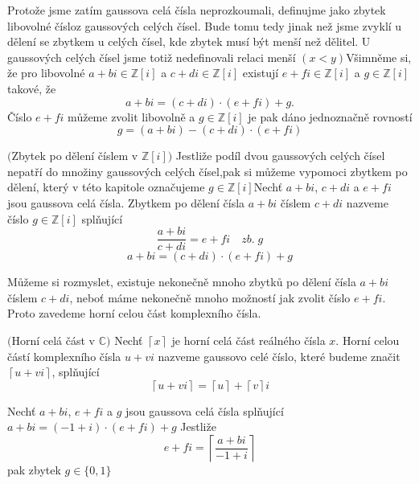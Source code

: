 \documentclass[czech,bachelor,dept470,male]{diploma}
\begin{document}
Protože jsme zatím gaussova celá čísla neprozkoumali, definujme jako zbytek libovolné číslo\newline z gaussových celých čísel. Bude tomu tedy jinak než jsme zvyklí u dělení se zbytkem u celých čísel, kde zbytek musí být menší než dělitel. U gaussových celých čísel jsme totiž nedefinovali relaci menší $(x<y)$\newline Všimněme si, že pro libovolné $a+bi \in \mathbb{Z}[i]$ a $c+di \in \mathbb{Z}[i]$ existují $e+fi \in \mathbb{Z}[i]$ a $g\in \mathbb{Z}[i]$ takové, že
$$a+bi = (c+di)\cdot(e+fi) + g. $$
Číslo $e+fi$ můžeme zvolit libovolně a $g\in \mathbb{Z}[i]$ je pak dáno jednoznačně rovností $$g = (a+bi) - (c+di)\cdot(e+fi)$$
\begin{definition}\label{KDZ}$($Zbytek po dělení číslem v $\mathbb{Z}[i])$\newline
	Jestliže podíl dvou gaussových celých čísel nepatří do množiny gaussových celých čísel,\newline pak si můžeme vypomoci zbytkem po dělení, který v této kapitole označujeme $g \in \mathbb{Z}[i]$\newline Nechť $a+bi$, $c+di$ a $e+fi$ jsou gaussova celá čísla. Zbytkem po dělení čísla $a+bi$ číslem $c+di$ nazveme číslo $g \in \mathbb{Z}[i]$ splňující
	$$\frac{a+bi}{c+di}=e+fi \quad zb.\;g$$$$a+bi = (c+di)\cdot(e+fi) + g$$
\end{definition}
Můžeme si rozmyslet, existuje nekonečně mnoho zbytků po dělení čísla $a+bi$ číslem $c+di$, neboť máme nekonečně mnoho možností jak zvolit číslo $e+fi$.
Proto zavedeme horní celou část komplexního čísla.
\begin{definition}
	$($Horní celá část v $\mathbb{C})$ Nechť $\left\lceil x \right\rceil$ je horní celá část reálného čísla $x$. Horní celou částí komplexního čísla $u+vi$ nazveme gaussovo celé číslo, které budeme značit $\left\lceil u+vi \right\rceil$, splňující
	$$\left\lceil u+vi \right\rceil = \left\lceil u \right\rceil + \left\lceil v \right\rceil i $$
\end{definition}
\begin{theorem}\label{VX}
	Nechť $a+bi$, $e+fi$ a $g$ jsou gaussova celá čísla splňující
	$a+bi = (-1+i)\cdot(e+fi) + g$ Jestliže
	$$ e+fi = \left\lceil\frac{a+bi}{-1+i}\right\rceil$$
	pak zbytek $g \in \{0,1\}$
\end{theorem}
\end{document}

